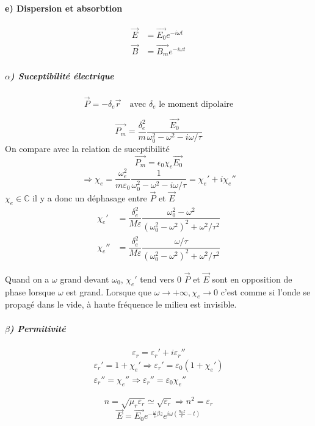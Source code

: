 \documentclass[12pt,a4paper]{report}
\newcommand{\ens}[1]{\mathbb{#1}}
\begin{document}
\paragraph{e) Dispersion et absorbtion}

\begin{align*}
	\vec	{E} &= \vec{E_0} e^{-i\omega t}\\
	\vec	{B} &= \vec{B_m} e^{-i\omega t}
\end{align*}

\subparagraph{$\alpha$) Suceptibilité électrique}

\[
	\vec{P} = - \delta_e \vec{r} \quad \text{avec }\delta_e \text{ le moment dipolaire}
\]

\[
	\vec{P_m} = \dfrac{\delta_e^2}{m} \dfrac{\vec{E_0}}{\omega_0^2 - \omega^2 - i\omega/\tau}
\]
On compare avec la relation de suceptibilité
\[
	\vec{P_m} = \epsilon_0 \chi_e \vec{E_0}
\]
\[
	\Rightarrow \chi_e = \dfrac{\omega_e^2}{m\varepsilon_0} \dfrac{1}{\omega_0^2 - \omega^2 - i\omega/\tau} = \chi_e' + i\chi_e''
\]
\(\chi_e \in \ens{C}\) il y a donc un déphasage entre \(\vec{P}\) et \(\vec{E}\)
\begin{align*}
	\chi_e' &= \dfrac{\delta_e^2}{M\varepsilon} \dfrac{\omega_0^2 - \omega^2}{\left( \omega_0^2 -\omega^2 \right)^2 + \omega^2/\tau^2}\\
	\chi_e'' &= \dfrac{\delta_e^2}{M\varepsilon} \dfrac{\omega/\tau}{\left( \omega_0^2 -\omega^2 \right)^2 + \omega^2/\tau^2}
\end{align*}

Quand on a \(\omega\) grand devant \(\omega_0\), \(\chi_e'\) tend vers 0
\(\vec{P}\) et \(\vec{E}\) sont en opposition de phase lorsque \(\omega\) est grand.
Lorsque que \(\omega \rightarrow +\infty, \chi_e \rightarrow 0\) c'est comme si l'onde se propagé dans le vide, à haute fréquence le milieu est invisible.

\subparagraph{$\beta$) Permitivité}
\[
	\varepsilon_r = \varepsilon_r' + i\varepsilon_r''
\]
\begin{align*}
	\varepsilon_r' = 1 + \chi_e' \Rightarrow \varepsilon_r' = \varepsilon_0 ( 1 + \chi_e')\\
	\varepsilon_r'' =\chi_e'' \Rightarrow \varepsilon_r'' = \varepsilon_0 \chi_e''
\end{align*}

\[
	n = \sqrt{\mu_r \varepsilon_r} \simeq \sqrt{\varepsilon_r} \Rightarrow n^2 = \varepsilon_r
\]
\[
	\vec{E} = \vec{E_0} e^{-\frac{\omega}{c} \beta z}e^{i\omega \left( \frac{n_0 z}{c} - t\right)}
\]
\end{document}

